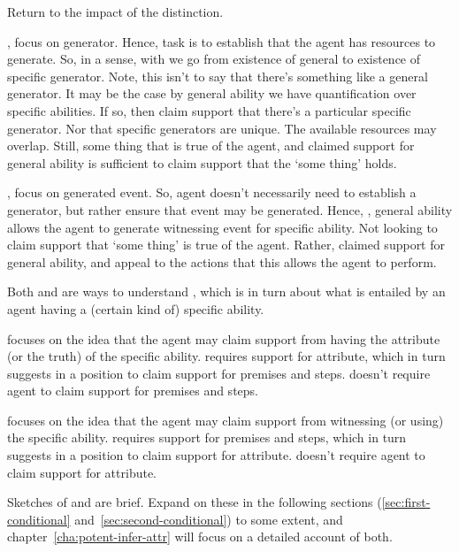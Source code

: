 \begin{note}
  Return to the impact of the distinction.

  \AR{}, focus on generator.
  Hence, task is to establish that the agent has resources to generate.
  So, in a sense, with \gsi{} we go from existence of general to existence of specific generator.
  Note, this isn't to say that there's something like a general generator.
  It may be the case by general ability we have quantification over specific abilities.
  If so, then claim support that there's a particular specific generator.
  Nor that specific generators are unique.
  The available resources may overlap.
  Still, some thing that is true of the agent, and claimed support for general ability is sufficient to claim support that the `some thing' holds.

  \WR{}, focus on generated event.
  So, agent doesn't necessarily need to establish a generator, but rather ensure that event may be generated.
  Hence, \gsi{}, general ability allows the agent to generate witnessing event for specific ability.
  Not looking to claim support that `some thing' is true of the agent.
  Rather, claimed support for general ability, and appeal to the actions that this allows the agent to perform.
\end{note}

\begin{note}
  Both \AR{} and \WR{} are ways to understand , which is in turn about what is entailed by an agent having a (certain kind of) specific ability.

  \AR{} focuses on the idea that the agent may claim support from having the attribute (or the truth) of the specific ability.
  \AR{} requires support for attribute, which in turn suggests in a position to claim support for premises and steps.
  \AR{} doesn't require agent to claim support for premises and steps.

  \WR{} focuses on the idea that the agent may claim support from witnessing (or using) the specific ability.
  \WR{} requires support for premises and steps, which in turn suggests in a position to claim support for attribute.
  \WR{} doesn't require agent to claim support for attribute.
\end{note}

\begin{note}
  Sketches of \AR{} and \WR{} are brief.
  Expand on these in the following sections (\ref{sec:first-conditional} and~\ref{sec:second-conditional}) to some extent, and chapter~\ref{cha:potent-infer-attr} will focus on a detailed account of both.
\end{note}

